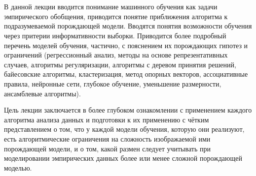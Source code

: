 \chapter{\docname}

В данной лекции вводится понимание машинного обучения как задачи эмпирического обобщения, приводится понятие приближения алгоритма к подразумеваемой порождающей модели. Вводятся понятия возможности обучения через притерии информативности выборки. Приводится более подробный перечень моделей обучения, частично, с пояснением их порождающих гипотез и ограничений (регрессионный анализ, методы на основе репрезентативных случаев, алгоритмы регуляризации, алгоритмы с деревом принятия решений, байесовские алгоритмы, кластеризация, метод опорных векторов, ассоциативные правила, нейронные сети, глубокое обучение, уменьшение размерности, ансамблевые алгоритмы).

Цель лекции заключается в более глубоком ознакомлении с применением каждого алгоритма анализа данных и подготовки к их применению с чётким представлением о том, что у каждой модели обучения, которую они реализуют, есть алгоритмические ограничения на сложность изображаемой ими порождающей модели, и о том, какой размен следует учитывать при моделировании эмпирических данных более или менее сложной порождающей моделью.
